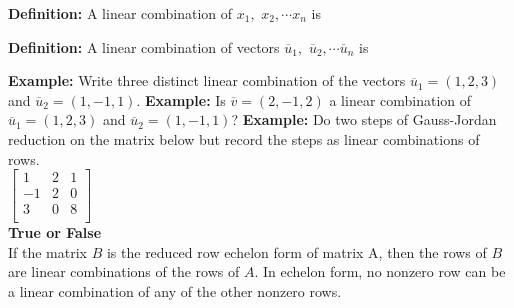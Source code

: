 \documentclass[11pt,fleqn]{article}
\begin{document}
\renewcommand{\headrulewidth}{0pt}
\newcommand{\blank}[1]{\rule{#1}{0.75pt}}
\renewcommand{\d}{\displaystyle}
\vspace*{-0.7in}
\begin{center}
  \large {}
\end{center}

\textbf{Definition:} A linear combination of $x_1,$ $x_2, \cdots x_n$ is \\
\vspace{1in}


\textbf{Definition:} A linear combination of vectors $\overline{u}_1,$ $\overline{u}_2, \cdots \overline{u}_n$ is \\
\vspace{1in}

\textbf{Example:} Write three distinct linear combination of the vectors $\overline{u}_1=(1,2,3)$ and $\overline{u}_2=(1,-1,1).$
\vspace{1in}
\textbf{Example:} Is $\overline{v}=(2,-1,2)$ a linear combination of $\overline{u}_1=(1,2,3)$ and $\overline{u}_2=(1,-1,1)$?
\vfill
\textbf{Example:} Do two steps of Gauss-Jordan reduction on the matrix below but record the steps as linear combinations of rows.\\

$\begin{bmatrix}
1&2&1\\-1&2&0\\3&0&8\\
\end{bmatrix}$\\
\vfill
\newpage
\textbf{True or False} \\

If the matrix $B$ is the reduced row echelon form of matrix A, then the rows of $B$ are linear combinations of the rows of $A.$
\vfill
In echelon form, no nonzero row can be a linear combination of any of the other nonzero rows.
\vfill
\end{document}
